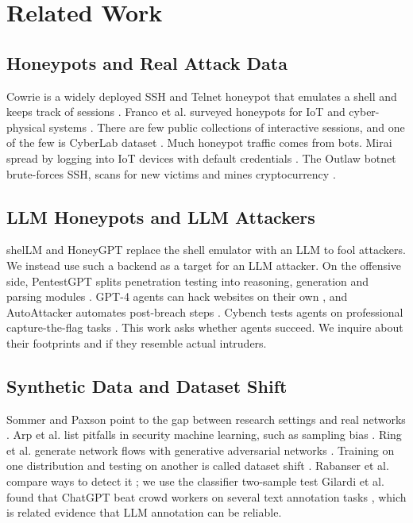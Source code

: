 \documentclass[runningheads]{llncs}
\begin{document}
\section{Related Work}

\subsection{Honeypots and Real Attack Data}

Cowrie is a widely deployed SSH and Telnet honeypot that emulates a shell and keeps track of sessions \cite{oosterhof2015cowrie}. Franco et al. surveyed honeypots for IoT and cyber-physical systems \cite{franco2021survey}. There are few public collections of interactive sessions, and one of the few is CyberLab dataset \cite{sedlar2020cyberlab}. Much honeypot traffic comes from bots. Mirai spread by logging into IoT devices with default credentials \cite{antonakakis2017mirai}. The Outlaw botnet brute-forces SSH, scans for new victims and mines cryptocurrency \cite{trendmicro2018outlaw}.

\subsection{LLM Honeypots and LLM Attackers}

shelLM \cite{sladic2023shellm} and HoneyGPT \cite{wang2024honeygpt} replace the shell emulator with an LLM to fool attackers. We instead use such a backend as a target for an LLM attacker. On the offensive side, PentestGPT splits penetration testing into reasoning, generation and parsing modules \cite{deng2024pentestgpt}. GPT-4 agents can hack websites on their own \cite{fang2024hack}, and AutoAttacker automates post-breach steps \cite{xu2024autoattacker}. Cybench tests agents on professional capture-the-flag tasks \cite{zhang2025cybench}. This work asks whether agents succeed. We inquire about their footprints and if they resemble actual intruders.

\subsection{Synthetic Data and Dataset Shift}

Sommer and Paxson point to the gap between research settings and real networks \cite{sommer2010closed}. Arp et al. list pitfalls in security machine learning, such as sampling bias \cite{arp2022dosdonts}. Ring et al. generate network flows with generative adversarial networks \cite{ring2019gan}. Training on one distribution and testing on another is called dataset shift \cite{quinonero2009dataset}. Rabanser et al. compare ways to detect it \cite{rabanser2019failing}; we use the classifier two-sample test \cite{lopezpaz2017c2st} Gilardi et al. found that ChatGPT beat crowd workers on several text annotation tasks \cite{gilardi2023chatgpt}, which is related evidence that LLM annotation can be reliable.
\end{document}
